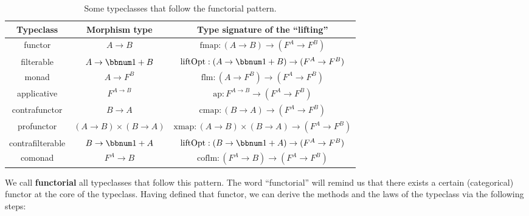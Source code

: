 \begin{table}
\begin{centering}
\begin{tabular}{|c|c|c|}
\hline 
\textbf{\footnotesize{}Typeclass} & \textbf{\footnotesize{}Morphism type} & \textbf{\footnotesize{}Type signature of the \textsf{``}lifting\textsf{''}}\tabularnewline
\hline 
\hline 
{\footnotesize{}functor} & {\footnotesize{}$A\rightarrow B$} & {\footnotesize{}$\text{fmap}:\left(A\rightarrow B\right)\rightarrow(F^{A}\rightarrow F^{B})$}\tabularnewline
\hline 
{\footnotesize{}filterable} & {\footnotesize{}$A\rightarrow\bbnum 1+B$} & {\footnotesize{}$\text{liftOpt}:\left(A\rightarrow\bbnum 1+B\right)\rightarrow(F^{A}\rightarrow F^{B})$}\tabularnewline
\hline 
{\footnotesize{}monad} & {\footnotesize{}$A\rightarrow F^{B}$} & {\footnotesize{}$\text{flm}:(A\rightarrow F^{B})\rightarrow(F^{A}\rightarrow F^{B})$}\tabularnewline
\hline 
{\footnotesize{}applicative} & {\footnotesize{}$F^{A\rightarrow B}$} & {\footnotesize{}$\text{ap}:F^{A\rightarrow B}\rightarrow(F^{A}\rightarrow F^{B})$}\tabularnewline
\hline 
{\footnotesize{}contrafunctor} & {\footnotesize{}$B\rightarrow A$} & {\footnotesize{}$\text{cmap}:\left(B\rightarrow A\right)\rightarrow(F^{A}\rightarrow F^{B})$}\tabularnewline
\hline 
{\footnotesize{}profunctor} & {\footnotesize{}$\left(A\rightarrow B\right)\times\left(B\rightarrow A\right)$} & {\footnotesize{}$\text{xmap}:\left(A\rightarrow B\right)\times\left(B\rightarrow A\right)\rightarrow(F^{A}\rightarrow F^{B})$}\tabularnewline
\hline 
{\footnotesize{}contrafilterable} & {\footnotesize{}$B\rightarrow\bbnum 1+A$} & {\footnotesize{}$\text{liftOpt}:\left(B\rightarrow\bbnum 1+A\right)\rightarrow(F^{A}\rightarrow F^{B})$}\tabularnewline
\hline 
{\footnotesize{}comonad\index{comonad}} & {\footnotesize{}$F^{A}\rightarrow B$} & {\footnotesize{}$\text{coflm}:(F^{A}\rightarrow B)\rightarrow(F^{A}\rightarrow F^{B})$}\tabularnewline
\hline 
\end{tabular}
\par\end{centering}
\caption{Some typeclasses that follow the functorial pattern.\label{tab:functorial-typeclasses}}
\end{table}

We call \textbf{functorial} all
typeclasses that follow this pattern. The word \textsf{``}functorial\textsf{''} will
remind us that there exists a certain (categorical) functor at the
core of the typeclass. Having defined that functor, we can derive
the methods and the laws of the typeclass via the following steps:

